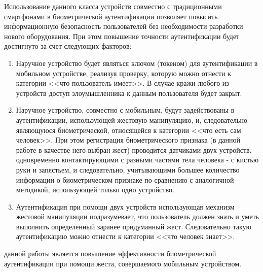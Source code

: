 Использование данного класса устройств совместно с традиционными смартфонами в биометрической аутентификации позволяет повысить информационную безопасность пользователей без необходимости разработки нового оборудования. При этом повышение точности аутентификации будет достигнуто за счет следующих факторов:

\begin{enumerate}
\item Наручное устройство будет являться ключом (токеном) для аутентификации в мобильном устройстве, реализуя проверку, которую можно отнести к категории <<что пользователь имеет>>. В случае кражи любого из устройств доступ злоумышленника к данным пользователя будет закрыт.
\item Наручное устройство, совместно с мобильным, будут задействованы в  аутентификации, использующей жестовую манипуляцию, и, следовательно являющуюся биометрической, относящейся к категории <<что есть сам человек>>. При этом регистрация биометрического признака (в данной работе в качестве него выбран жест) проводится датчиками двух устройств, одновременно контактирующими с разными частями тела человека -  с кистью руки и запястьем, и следовательно, учитывающими большее количество информации о биометрическом признаке по сравнению с аналогичной методикой, использующей только одно устройство. 
\item Аутентификация при помощи двух устройств использующая механизм жестовой манипуляции подразумевает, что пользователь должен знать и уметь выполнить определенный заранее придуманный жест. Следовательно такую аутентификацию можно отнести к категории <<что человек знает>>. 
\end{enumerate}


{\aim} данной работы является повышение эффективности биометрической аутентификации при помощи жеста, совершаемого мобильным устройством. 

